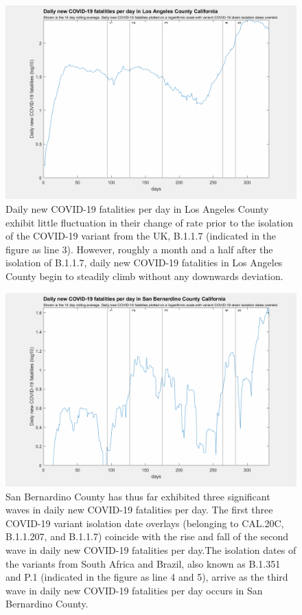 \documentclass[]{article}
\begin{document}
\begin{figure}[!h]
	\includegraphics[width=\linewidth]{images/los_angeles_fatalities_strains_log.png}
	\caption{Daily new COVID-19 fatalities per day in Los Angeles County exhibit little fluctuation in their change of rate prior to the isolation of the COVID-19 variant from the UK, B.1.1.7 (indicated in the figure as line 3). However, roughly a month and a half after the isolation of B.1.1.7, daily new COVID-19 fatalities in Los Angeles County begin to steadily climb without any downwards deviation.  }
	\label{fig:images/los_angeles_fatalities_strains_logLabel}
\end{figure}

\begin{figure}[!h]
	\includegraphics[width=\linewidth]{images/san_bernardino_fatalities_strains_log.png}
	\caption{San Bernardino County has thus far exhibited three significant waves in daily new COVID-19 fatalities per day. The first three COVID-19 variant isolation date overlays (belonging to CAL.20C, B.1.1.207, and B.1.1.7) coincide with the rise and fall of the second wave in daily new COVID-19 fatalities per day.The isolation dates of the variants from South Africa and Brazil, also known as B.1.351 and P.1 (indicated in the figure as line 4 and 5), arrive as the third wave in daily new COVID-19 fatalities per day occurs in San Bernardino County.}
	\label{fig:images/san_bernardino_fatalities_strains_logLabel}
\end{figure}
\end{document}
